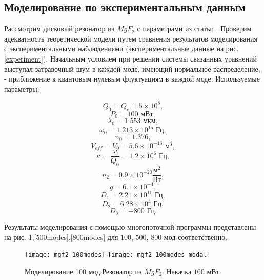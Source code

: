 \subsection{Моделирование по экспериментальным данным}
\label{subsection_experiment}

Рассмотрим дисковый резонатор из $MgF_2$ с параметрами из статьи \cite{mlg_to_nature}. Проверим адекватность теоретической модели путем сравнения результатов моделирования с экспериментальными наблюдениями (экспериментальные данные на рис. \ref{experiment}). Начальным условием при решении системы связанных уравнений выступал затравочный шум в каждой моде, имеющий нормальное распределение, - приближение к квантовым нулевым флуктуациям в каждой моде. Используемые параметры:

\begin{equation}
Q_0=Q_c=5\times10^8,
\end{equation}
\begin{equation}
P_0=100\text{ мВт},
\end{equation}
\begin{equation}
\lambda_0=1.553\text{ мкм},
\end{equation}
\begin{equation}
\omega_0=1.213\times10^{15}\text{ Гц},
\end{equation}
\begin{equation}
n_0=1.376,
\end{equation}
\begin{equation}
V_{eff}=V_0=5.6\times10^{-13}\text{ м}^3,
\end{equation}
\begin{equation}
\kappa=\frac{\omega}{Q_0}=1.2\times10^6\text{ Гц},
\end{equation}
\begin{equation}
n_2=0.9\times10^{-20}\frac{\text{м}^2}{\text{Вт}},
\end{equation}
\begin{equation}
g=6.1\times10^{-4},
\end{equation}
\begin{equation}
D_1=2.21\times10^{11}\text{ Гц},
\end{equation}
\begin{equation}
D_2=6.28\times10^4\text{ Гц},
\end{equation}
\begin{equation}
D_3=-800\text{ Гц}.
\end{equation}

Результаты моделирования с помощью многопоточной программы представлены на рис. \ref{100modes},\ref{500modes},\ref{800modes} для $100$, $500$, $800$ мод соответственно.
\begin{figure}
  \texttt{[image: mgf2\_100modes]}
  \texttt{[image: mgf2\_100modes\_modal]}
  \caption{Моделирование 100 мод.Резонатор из $MgF_2$. Накачка $100$ мВт} \label{100modes}
\end{figure}

